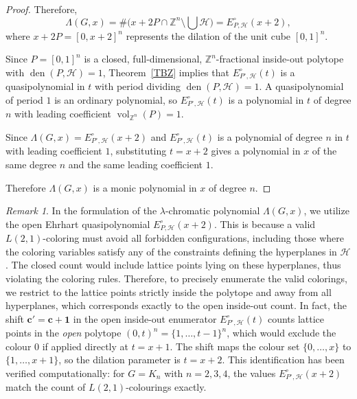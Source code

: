 \documentclass{birkjour}
\theoremstyle{definition}
\theoremstyle{remark}
\newtheorem{remark}[theorem]{Remark}
\numberwithin{equation}{section}
\begin{document}
\begin{proof}
Therefore,
\[
\Lambda(G,x) = \#\big( x+2P \cap \mathbb{Z}^n \setminus \bigcup \mathcal{H} \big)
= E^{\circ}_{P,\mathcal{H}}(x+2),
\]
where $x+2P = [0, x+2]^n$ represents the dilation of the unit cube $[0, 1]^n$.

Since \( P = [0,1]^n \) is a closed, full-dimensional, \( \mathbb{Z}^n \)-fractional
inside-out polytope with \( \operatorname{den}(P,\mathcal{H}) = 1 \),
Theorem~\ref{TBZ} implies that \( E^{\circ}_{P^{\circ},\mathcal{H}}(t) \) is a
quasipolynomial in \( t \) with period dividing \( \operatorname{den}(P,\mathcal{H}) = 1 \).
A quasipolynomial of period \( 1 \) is an ordinary polynomial, so
\( E^{\circ}_{P^{\circ},\mathcal{H}}(t) \) is a polynomial in \( t \) of degree
\( n \) with leading coefficient \( \operatorname{vol}_{\mathbb{Z}^n}(P) = 1 \).
 
Since \( \Lambda(G,x) = E^{\circ}_{P^{\circ},\mathcal{H}}(x+2) \) and
\( E^{\circ}_{P^{\circ},\mathcal{H}}(t) \) is a polynomial of degree \( n \) in \( t \)
with leading coefficient \( 1 \), substituting \( t = x+2 \) gives a polynomial
in \( x \) of the same degree \( n \) and the same leading coefficient \( 1 \).

Therefore \( \Lambda(G, x) \) is a monic polynomial in \( x \) of degree \( n \).
\end{proof}
 
\begin{remark}
In the formulation of the \( \lambda \)-chromatic polynomial \( \Lambda(G, x) \), we utilize the open Ehrhart quasipolynomial \( E^{\circ}_{P, \mathcal{H}}(x+2) \). This is because a valid \( L(2,1) \)-coloring must avoid all forbidden configurations, including those where the coloring variables satisfy any of the constraints defining the hyperplanes in \( \mathcal{H} \). The closed count would include lattice points lying on these hyperplanes, thus violating the coloring rules. Therefore, to precisely enumerate the valid colorings, we restrict to the lattice points strictly inside the polytope and away from all hyperplanes, which corresponds exactly to the open inside-out count. In fact, the shift \( \mathbf{c}' = \mathbf{c} + \mathbf{1} \) in the open inside-out enumerator \( E^{\circ}_{P^{\circ},\mathcal{H}}(t) \)
counts lattice points in the \emph{open} polytope \( (0,t)^n = \{1,\dots,t-1\}^n \),
which would exclude the colour \( 0 \) if applied directly at \( t = x+1 \).
The shift maps the colour set \( \{0,\dots,x\} \) to \( \{1,\dots,x+1\} \),
so the dilation parameter is \( t = x+2 \).
This identification has been verified computationally: for \( G = K_n \)
with \( n = 2, 3, 4 \), the values \( E^{\circ}_{P^{\circ},\mathcal{H}}(x+2) \)
match the count of \( L(2,1) \)-colourings exactly.
\end{remark}
\end{document}
